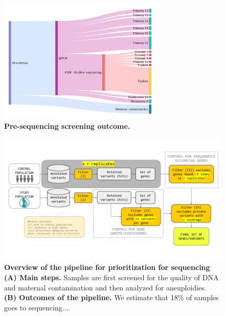 
\begin{figure}[h]
\centering
\includegraphics[width=0.7\textwidth]{fig/ibelieve.png}
\caption{\textbf{Pre-sequencing screening outcome.} }
\label{fig:presequencing}
\end{figure}

\begin{figure}[ht]
\centering
\includegraphics[width=\linewidth]{fig/pipeonly.png}
\caption{\textbf{Overview of the pipeline for prioritization for sequencing (A) Main steps.} Samples are first screened for the quality of DNA and maternal contamination and then analyzed for aneuploidies. \textbf{(B) Outcomes of the pipeline.} We estimate that 18\% of samples goes to sequencing....} 
\label{fig:pipeline}
\end{figure}

